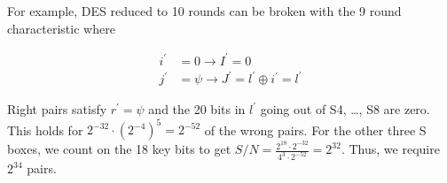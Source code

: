 \documentclass[twoside]{article}
\begin{document}
For example, DES reduced to 10 rounds can be broken with the 9 round
characteristic where

\begin{align}
    i^\prime &= 0 \rightarrow I^\prime = 0 \label{eq:des-10rd-i} \\
    j^\prime &= \psi \rightarrow J^\prime = l^\prime \oplus i^\prime = l^\prime \label{eq:des-10rd-j}
\end{align}

Right pairs satisfy \(r^\prime = \psi\) and the 20 bits in \(l^\prime\) going
out of S4, \dots, S8 are zero. This holds for \(2^{-32} \cdot (2^{-4})^5 =
2^{-52}\) of the wrong pairs. For the other three S boxes, we count on the 18
key bits to get \(S/N = \frac{2^{18} \cdot 2^{-32}}{4^3 \cdot 2^{-52}} =
2^{32}\). Thus, we require \(2^{34}\) pairs.
\end{document}

